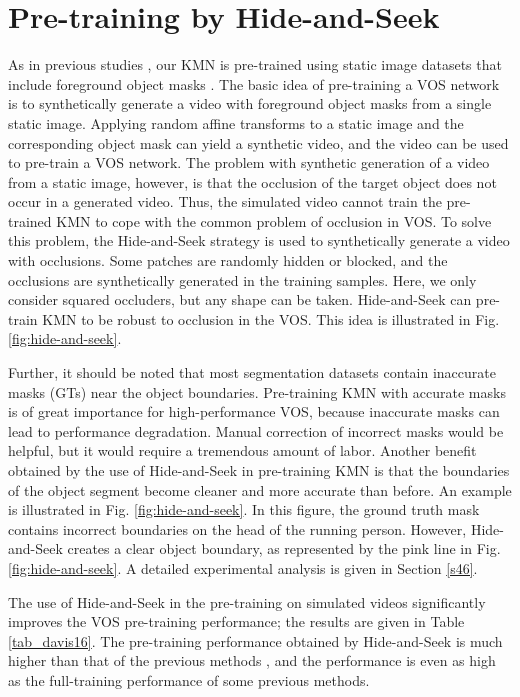 \section{Pre-training by Hide-and-Seek}
\label{s33}
As in previous studies \cite{perazzi2017learning,wug2018fast,Oh_2019_ICCV}, our KMN is pre-trained using static image datasets that include foreground object masks \cite{b42,b43,hariharan2011semantic,shi2015hierarchical,cheng2014global,wang2017salient}. The basic idea of pre-training a VOS network is to synthetically generate a video with foreground object masks from a single static image. Applying random affine transforms to a static image and the corresponding object mask can yield a synthetic video, and the video can be used to pre-train a VOS network. The problem with synthetic generation of a video from a static image, however, is that the occlusion of the target object does not occur in a generated video. Thus, the simulated video cannot train the pre-trained KMN to cope with the common problem of occlusion in VOS. To solve this problem, the Hide-and-Seek strategy is used to synthetically generate a video with occlusions. Some patches are randomly hidden or blocked, and the occlusions are synthetically generated in the training samples. Here, we only consider squared occluders, but any shape can be taken. Hide-and-Seek can pre-train KMN to be robust to occlusion in the VOS. This idea is illustrated in Fig. \ref{fig:hide-and-seek}.

Further, it should be noted that most segmentation datasets contain inaccurate masks (GTs) near the object boundaries. Pre-training KMN with accurate masks is of great importance for high-performance VOS, because inaccurate masks can lead to performance degradation. Manual correction of incorrect masks would be helpful, but it would require a tremendous amount of labor. Another benefit obtained by the use of Hide-and-Seek in pre-training KMN is that the boundaries of the object segment become cleaner and more accurate than before. An example is illustrated in Fig. \ref{fig:hide-and-seek}. In this figure, the ground truth mask contains incorrect boundaries on the head of the running person. However, Hide-and-Seek creates a clear object boundary, as represented by the pink line in Fig. \ref{fig:hide-and-seek}. A detailed experimental analysis is given in Section \ref{s46}.

The use of Hide-and-Seek in the pre-training on simulated videos significantly improves the VOS pre-training performance; the results are given in Table \ref{tab_davis16}. The pre-training performance obtained by Hide-and-Seek is much higher than that of the previous methods \cite{wug2018fast,Oh_2019_ICCV}, and the performance is even as high as the full-training performance of some previous methods.

